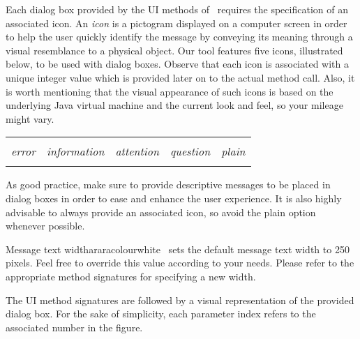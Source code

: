 Each dialog box provided by the UI methods of \arara\ requires the specification of an associated icon. An \emph{icon} is a pictogram displayed on a computer screen in order to help the user quickly identify the message by conveying its meaning through a visual resemblance to a physical object. Our tool features five icons, illustrated below, to be used with dialog boxes. Observe that each icon is associated with a unique integer value which is provided later on to the actual method call. Also, it is worth mentioning that the visual appearance of such icons is based on the underlying Java virtual machine and the current look and feel, so your mileage might vary.

\vspace{1em}

{\centering
\begin{tabularx}{0.8\textwidth}{YYYYY}
 &
 &
 &
 &
 \\
{\footnotesize\emph{error}} &
{\footnotesize\emph{information}} &
{\footnotesize\emph{attention}} &
{\footnotesize\emph{question}} &
{\footnotesize\emph{plain}} \\
 &
 &
 &
 &
\end{tabularx}\par}

\vspace{1.4em}

As good practice, make sure to provide descriptive messages to be placed in dialog boxes in order to ease and enhance the user experience. It is also highly advisable to always provide an associated icon, so avoid the plain option whenever possible.

\begin{messagebox}{Message text width}{araracolour}{\icok}{white}
\arara\ sets the default message text width to 250 pixels. Feel free to override this value according to your needs. Please refer to the appropriate method signatures for specifying a new width.
\end{messagebox}

The UI method signatures are followed by a visual representation of the provided dialog box. For the sake of simplicity, each parameter index refers to the associated number in the figure.

